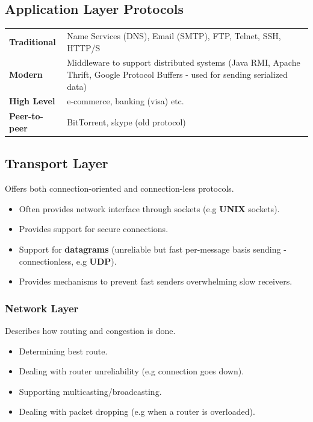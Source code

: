 \subsection{Application Layer Protocols}
\begin{tabular}{l p{}}
    \textbf{Traditional}  & Name Services (DNS), Email (SMTP), FTP, Telnet, SSH, HTTP/S                                                                     \\
    \textbf{Modern}       & Middleware to support distributed systems (Java RMI, Apache Thrift, Google Protocol Buffers - used for sending serialized data) \\
    \textbf{High Level}   & e-commerce, banking (visa) etc.                                                                                                 \\
    \textbf{Peer-to-peer} & BitTorrent, skype (old protocol)                                                                                                \\
\end{tabular}

\subsection{Transport Layer}
Offers both connection-oriented and connection-less protocols.
\begin{itemize}
    \setlength\itemsep{0em}
    \item Often provides network interface through sockets (e.g \textbf{UNIX} sockets).
    \item Provides support for secure connections.
    \item Support for \textbf{datagrams} (unreliable but fast per-message basis sending - connectionless, e.g \textbf{UDP}).
    \item Provides mechanisms to prevent fast senders overwhelming slow receivers.
\end{itemize}

\subsubsection*{Network Layer}
Describes how routing and congestion is done.
\begin{itemize}
    \setlength\itemsep{0em}
    \item Determining best route.
    \item Dealing with router unreliability (e.g connection goes down).
    \item Supporting multicasting/broadcasting.
    \item Dealing with packet dropping (e.g when a router is overloaded).
\end{itemize}

